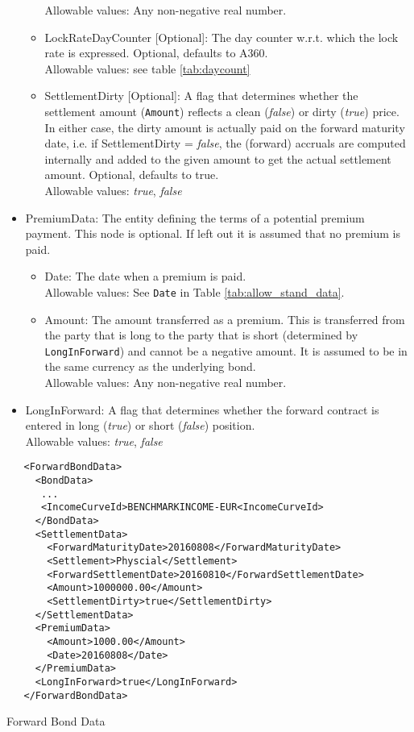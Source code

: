 \begin{itemize}
\begin{itemize}
         Allowable values: Any non-negative real number.
       \item LockRateDayCounter [Optional]: The day counter w.r.t. which the lock rate is expressed. Optional, defaults to A360. \\
         Allowable values: see table \ref{tab:daycount}
       \item SettlementDirty [Optional]: A flag that determines whether the settlement amount {({\tt Amount})} reflects
         a clean (\emph{false}) or dirty (\emph{true}) price. In either case, the dirty amount is actually paid on the
         forward maturity date, i.e. if SettlementDirty = \emph{false}, the (forward) accruals are computed internally
         and added to the given amount to get the actual settlement amount. Optional, defaults to true. \\
         Allowable values: \emph{true}, \emph{false}
   \end{itemize}
   \item PremiumData: The entity defining the terms of a potential premium payment. This node is optional. If left out it is assumed that no premium is paid.
   \begin{itemize}
       \item Date: The date when a premium is paid. \\
       Allowable values: See \lstinline!Date! in Table \ref{tab:allow_stand_data}.
       \item Amount: The amount transferred as a premium. This is transferred from the party that is long to the party
         that is short (determined by \lstinline!LongInForward!) and cannot be a negative amount. It is assumed to be in
         the same currency as the underlying bond.\\
       Allowable values: Any non-negative real number.
   \end{itemize}
   \item LongInForward: A flag that determines whether the forward contract is entered in long (\emph{true}) or short
     (\emph{false}) position. \\
       Allowable values: \emph{true}, \emph{false}
 \end{itemize}

\begin{listing}[H]
  \begin{verbatim}
   <ForwardBondData>
     <BondData>
      ...
      <IncomeCurveId>BENCHMARKINCOME-EUR<IncomeCurveId>
     </BondData>
     <SettlementData>
       <ForwardMaturityDate>20160808</ForwardMaturityDate>
       <Settlement>Physcial</Settlement>
       <ForwardSettlementDate>20160810</ForwardSettlementDate>
       <Amount>1000000.00</Amount>
       <SettlementDirty>true</SettlementDirty>
     </SettlementData>
     <PremiumData>
       <Amount>1000.00</Amount>
       <Date>20160808</Date>
     </PremiumData>
     <LongInForward>true</LongInForward>
   </ForwardBondData>
  \end{verbatim}
\caption{Forward Bond Data}
\label{lst:forward_bond}
\end{listing}

